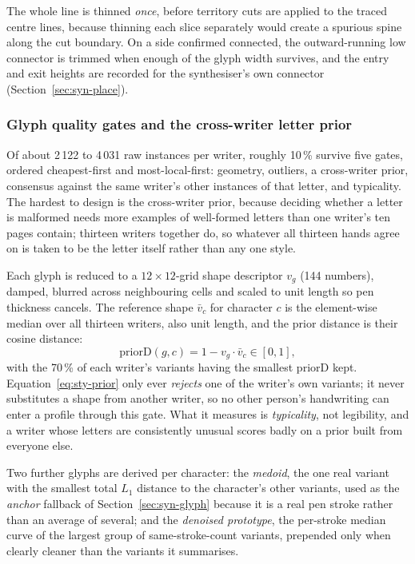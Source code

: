 The whole line is thinned \emph{once}, before territory cuts are applied to the traced centre lines, because thinning each slice separately would create a spurious spine along the cut boundary. On a side confirmed connected, the outward-running low connector is trimmed when enough of the glyph width survives, and the entry and exit heights are recorded for the synthesiser's own connector (Section~\ref{sec:syn-place}).

\subsubsection{Glyph quality gates and the cross-writer letter prior}
\label{sec:sty-gates}

Of about 2\,122 to 4\,031 raw instances per writer, roughly 10\,\% survive five gates, ordered cheapest-first and most-local-first: geometry, outliers, a cross-writer prior, consensus against the same writer's other instances of that letter, and typicality. The hardest to design is the cross-writer prior, because deciding whether a letter is malformed needs more examples of well-formed letters than one writer's ten pages contain; thirteen writers together do, so whatever all thirteen hands agree on is taken to be the letter itself rather than any one style.

Each glyph is reduced to a $12\times12$-grid shape descriptor $v_g$ (144 numbers), damped, blurred across neighbouring cells and scaled to unit length so pen thickness cancels. The reference shape $\bar v_c$ for character $c$ is the element-wise median over all thirteen writers, also unit length, and the prior distance is their cosine distance:
\begin{equation}
\mathrm{priorD}(g,c)=1-v_g\cdot\bar v_c\in[0,1],
\label{eq:sty-prior}
\end{equation}
with the 70\,\% of each writer's variants having the smallest $\mathrm{priorD}$ kept. Equation~\ref{eq:sty-prior} only ever \emph{rejects} one of the writer's own variants; it never substitutes a shape from another writer, so no other person's handwriting can enter a profile through this gate. What it measures is \emph{typicality}, not legibility, and a writer whose letters are consistently unusual scores badly on a prior built from everyone else.

Two further glyphs are derived per character: the \emph{medoid}, the one real variant with the smallest total $L_1$ distance to the character's other variants, used as the \emph{anchor} fallback of Section~\ref{sec:syn-glyph} because it is a real pen stroke rather than an average of several; and the \emph{denoised prototype}, the per-stroke median curve of the largest group of same-stroke-count variants, prepended only when clearly cleaner than the variants it summarises.

